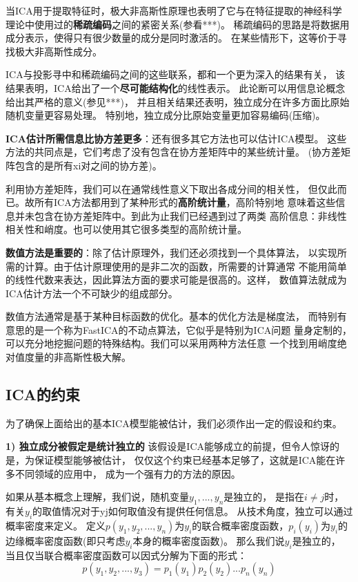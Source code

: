 当ICA用于提取特征时，极大非高斯性原理也表明了它与在特征提取的神经科学
理论中使用过的\textbf{稀疏编码}之间的紧密关系(参看***)。
稀疏编码的思路是将数据用成分表示，使得只有很少数量的成分是同时激活的。
在某些情形下，这等价于寻找极大非高斯性成分。

ICA与投影寻中和稀疏编码之间的这些联系，都和一个更为深入的结果有关，
该结果表明，ICA给出了一个\textbf{尽可能结构化}的线性表示。
此论断可以用信息论概念给出其严格的意义(参见***)，
并且相关结果还表明，独立成分在许多方面比原始随机变量更容易处理。
特别地，独立成分比原始变量更加容易编码(压缩)。
    
\textbf{ICA估计所需信息比协方差更多}：还有很多其它方法也可以估计ICA模型。
这些方法的共同点是，它们考虑了没有包含在协方差矩阵中的某些统计量。
(协方差矩阵包含的是所有xi对之间的协方差)。

利用协方差矩阵，我们可以在通常线性意义下取出各成分间的相关性，
但仅此而已。故所有ICA方法都用到了某种形式的\textbf{高阶统计量}，高阶特别地
意味着这些信息并未包含在协方差矩阵中。到此为止我们已经遇到过了两类
高阶信息：非线性相关性和峭度。也可以使用其它很多类型的高阶统计量。
    
\textbf{数值方法是重要的}：除了估计原理外，我们还必须找到一个具体算法，
以实现所需的计算。由于估计原理使用的是非二次的函数，所需要的计算通常
不能用简单的线性代数来表达，因此算法方面的要求可能是很高的。这样，
数值算法就成为ICA估计方法一个不可缺少的组成部分。

数值方法通常是基于某种目标函数的优化。基本的优化方法是梯度法，
而特别有意思的是一个称为FastICA的不动点算法，它似乎是特别为ICA问题
量身定制的，可以充分地挖掘问题的特殊结构。我们可以采用两种方法任意
一个找到用峭度绝对值度量的非高斯性极大解。
    
\subsection{ICA的约束}
为了确保上面给出的基本ICA模型能被估计，我们必须作出一定的假设和约束。

\textbf{1) 独立成分被假定是统计独立的}
该假设是ICA能够成立的前提，但令人惊讶的是，为保证模型能够被估计，
仅仅这个约束已经基本足够了，这就是ICA能在许多不同领域的应用中，
成为一个强有力的方法的原因。

如果从基本概念上理解，我们说，随机变量$y_1,...,y_n$是独立的，
是指在$i \ne j$时，
有关$y_i$的取值情况对于yj如何取值没有提供任何信息。
从技术角度，独立可以通过概率密度来定义。
定义$p(y_1,y_2,...,y_n)$为$y_i$的联合概率密度函数，$p_i(y_i)$为$y_i$的
边缘概率密度函数(即只考虑$y_i$本身的概率密度函数)。
那么我们说$y_i$是独立的，
当且仅当联合概率密度函数可以因式分解为下面的形式：
\begin{equation}
p(y_1, y_2, ..., y_3) = p_1(y_1)p_2(y_2)...p_n (y_n)
\end{equation}

